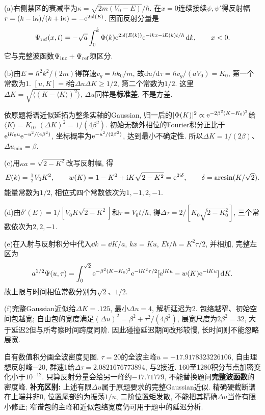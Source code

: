 \begin{solution}
(a)右侧禁区的衰减率为$\kappa=\sqrt{2m(V_0-E)}/\hbar$. 在$x=0$连续接续$\psi,\psi'$得反射幅$r=(k-\mathrm i\kappa)/(k+\mathrm i\kappa)=-\mathrm e^{2\mathrm i\delta(E)}$. 因而反射分量是
\[
\Psi_{\rm ref}(x,t)=-\sqrt a\int_0^{\hat k}\Phi(k)\mathrm e^{2\mathrm i\delta(E(k))}
\mathrm e^{-\mathrm i kx-\mathrm i E(k)t/\hbar}\,\mathrm d k,\qquad x<0.
\]
它与完整波函数$\Psi_{\rm inc}+\Psi_{\rm ref}$须区分.

(b)由$E=\hbar^2k^2/(2m)$得群速$v_g=\hbar k_0/m$, 故$\mathrm du/\mathrm d\tau=\hbar v_g/(aV_0)=K_0$, 第一个常数为1. $[u,K]=\ii$给$\Delta u\Delta K\ge1/2$, 第二个常数为$1/2$. 这里$\Delta K=\sqrt{\langle(K-\langle K\rangle)^2\rangle}$, $\Delta u$同样是\textbf{标准差}, 不是方差.

依原题将谱近似延拓为整条实轴的Gaussian, 归一后的$|\Phi(K)|^2\propto\mathrm e^{-2\beta^2(K-K_0)^2}$给$\langle K\rangle=K_0$, $(\Delta K)^2=1/(4\beta^2)$. 初始无额外相位的Fourier积分正比于$\mathrm e^{\mathrm i K_0u}\mathrm e^{-u^2/(4\beta^2)}$, 坐标概率为$\mathrm e^{-u^2/(2\beta^2)}$, 达到最小不确定性. 所以$\Delta K=1/(2\beta)$、$\Delta u_{\min}=\beta$.

(c)用$\kappa a=\sqrt{2-K^2}$改写反射幅, 得
\[
E(k)=\tfrac12V_0K^2,\qquad
w(K)=1-K^2+\mathrm i K\sqrt{2-K^2}=\mathrm e^{2\mathrm i\delta},\qquad
\delta=\arcsin(K/\sqrt2).
\]
能量常数为$1/2$, 相位式四个常数依次为$1,-1,2,-1$.

(d)由$\delta'(E)=1/[V_0K\sqrt{2-K^2}]$和$\tau=V_0t/\hbar$, 得$\Delta\tau=2/[K_0\sqrt{2-K_0^2}]$, 三个常数依次为$2,2,-1$.

(e)在入射与反射积分中代入$\dd k=\dd K/a$, $kx=Ku$, $Et/\hbar=K^2\tau/2$, 并相加, 完整左区为
\[
a^{1/2}\Psi(u,\tau)=\int_0^{\sqrt2}\mathrm e^{-\beta^2(K-K_0)^2}\mathrm e^{-\mathrm i K^2\tau/2}
[\mathrm e^{\mathrm i Ku}-w(K)\mathrm e^{-\mathrm i Ku}]\,\mathrm d K.
\]
故上限与时间相位常数分别为$\sqrt2$、$1/2$.

(f)完整Gaussian近似给$\Delta K=.125$, 最小$\Delta u=4$, 解析延迟为2. 包络越窄、初始空间包越宽; 自由包的宽度满足$(\Delta u)^2=\beta^2+\tau^2/(4\beta^2)$, 展宽尺度为$2\beta^2=32$, 大于延迟2但与所考察时间跨度同阶. 因此碰撞延迟期间改形较慢, 长时间则不能忽略展宽.

自有数值积分画全波密度见图. $\tau=20$的全波主峰$u=-17.9178323226106$, 自由理想反射峰$-20$, 群速1给$\Delta\tau=2.0821676773894$, 与2接近. 160至1280积分节点加密变化小于$10^{-12}$. 只算反射分量会给另一峰约$-17.71779$, 不能替换题问\textbf{完整波函数}的密度峰.
\textbf{补充区别:} 上述有限$\Delta u$属于原题要求的完整Gaussian近似. 精确硬截断谱在上端并非0, 位置尾部约为振荡$1/u$, 二阶位置矩发散, 不能把其精确$\Delta u$当作有限小修正; 窄谱包的主峰和近似包络宽度仍可用于题中的延迟分析.

\end{solution}
